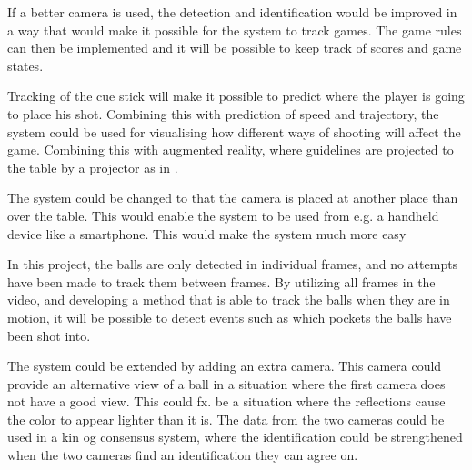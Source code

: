 If a better camera is used, the detection and identification would be improved in a way that would make it possible for the system to track games. The game rules can then be implemented and it will be possible to keep track of scores and game states.

Tracking of the cue stick will make it possible to predict where the player is going to place his shot. Combining this with prediction of speed and trajectory, the system could be used for visualising how different ways of shooting will affect the game. Combining this with augmented reality, where guidelines are projected to the table by a projector as in \cite{larsbopool}.

The system could be changed to that the camera is placed at another place than over the table. This would enable the system to be used from e.g. a handheld device like a smartphone. This would make the system much more easy

In this project, the balls are only detected in individual frames, and no attempts have been made to track them between frames. By utilizing all frames in the video, and developing a method that is able to track the balls when they are in motion, it will be possible to detect events such as which pockets the balls have been shot into.


The system could be extended by adding an extra camera. This camera could provide an alternative view of a ball in a situation where the first camera does not have a good view. This could fx. be a situation where the reflections cause the color to appear lighter than it is. The data from the two cameras could be used in a kin og consensus system, where the identification could be strengthened when the two cameras find an identification they can agree on.